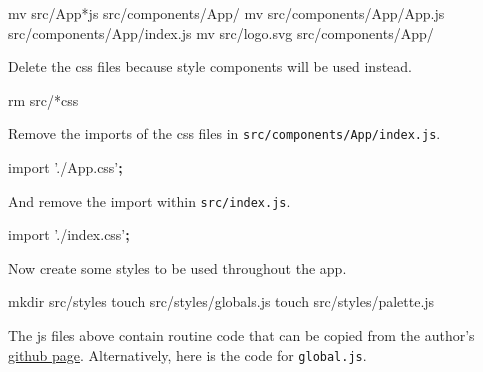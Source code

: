 \documentclass[]{book}
\newenvironment{Shaded}{\begin{snugshade}}{\end{snugshade}}
\newcommand{\KeywordTok}[1]{\textcolor[rgb]{0.13,0.29,0.53}{\textbf{#1}}}
\newcommand{\StringTok}[1]{\textcolor[rgb]{0.31,0.60,0.02}{#1}}
\newcommand{\FunctionTok}[1]{\textcolor[rgb]{0.00,0.00,0.00}{#1}}
\newcommand{\ExtensionTok}[1]{#1}
\newcommand{\NormalTok}[1]{#1}
\begin{document}
\begin{Shaded}
\begin{Highlighting}[]
\FunctionTok{mv}\NormalTok{ src/App*js src/components/App/}
\FunctionTok{mv}\NormalTok{ src/components/App/App.js src/components/App/index.js}
\FunctionTok{mv}\NormalTok{ src/logo.svg src/components/App/}
\end{Highlighting}
\end{Shaded}

Delete the css files because style components will be used instead.

\begin{Shaded}
\begin{Highlighting}[]
\FunctionTok{rm}\NormalTok{ src/*css}
\end{Highlighting}
\end{Shaded}

Remove the imports of the css files in
\texttt{src/components/App/index.js}.

\begin{Shaded}
\begin{Highlighting}[]
\ExtensionTok{import} \StringTok{'./App.css'}\KeywordTok{;}
\end{Highlighting}
\end{Shaded}

And remove the import within \texttt{src/index.js}.

\begin{Shaded}
\begin{Highlighting}[]
\ExtensionTok{import} \StringTok{'./index.css'}\KeywordTok{;}
\end{Highlighting}
\end{Shaded}

Now create some styles to be used throughout the app.

\begin{Shaded}
\begin{Highlighting}[]
\FunctionTok{mkdir}\NormalTok{ src/styles}
\FunctionTok{touch}\NormalTok{ src/styles/globals.js}
\FunctionTok{touch}\NormalTok{ src/styles/palette.js}
\end{Highlighting}
\end{Shaded}

The js files above contain routine code that can be copied from the
author's \href{https://github.com/treyhuffine/hn-clone}{github page}.
Alternatively, here is the code for \texttt{global.js}.
\end{document}

